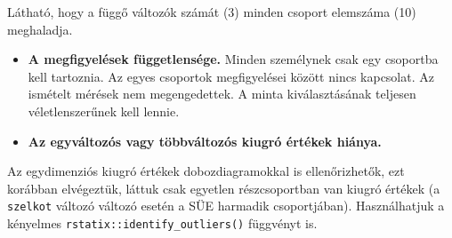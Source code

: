 \documentclass[
  letterpaper,
]{krantz}
\makeatletter
\newenvironment{Shaded}{\begin{snugshade}}{\end{snugshade}}
\newcommand{\AttributeTok}[1]{\textcolor[rgb]{0.40,0.45,0.13}{#1}}
\newcommand{\CommentTok}[1]{\textcolor[rgb]{0.37,0.37,0.37}{#1}}
\newcommand{\ConstantTok}[1]{\textcolor[rgb]{0.56,0.35,0.01}{#1}}
\newcommand{\FunctionTok}[1]{\textcolor[rgb]{0.28,0.35,0.67}{#1}}
\newcommand{\NormalTok}[1]{\textcolor[rgb]{0.00,0.23,0.31}{#1}}
\newcommand{\SpecialCharTok}[1]{\textcolor[rgb]{0.37,0.37,0.37}{#1}}
\newenvironment{kframe}{%
\medskip{}
\setlength{\fboxsep}{.8em}
 \def\at@end@of@kframe{}%
 \ifinner\ifhmode%
  \def\at@end@of@kframe{\end{minipage}}%
  \begin{minipage}{\columnwidth}%
 \fi\fi%
 \def\FrameCommand##1{\hskip\@totalleftmargin \hskip-\fboxsep
 \colorbox{shadecolor}{##1}\hskip-\fboxsep
     \hskip-\linewidth \hskip-\@totalleftmargin \hskip\columnwidth}%
 \MakeFramed {\advance\hsize-\width
   \@totalleftmargin\z@ \linewidth\hsize
   \@setminipage}}%
 {\par\unskip\endMakeFramed%
 \at@end@of@kframe}
\renewenvironment{Shaded}{\begin{kframe}}{\end{kframe}}
\makeatother
\begin{document}
\begin{Shaded}
\end{Shaded}

Látható, hogy a függő változók számát (3) minden csoport elemszáma (10)
meghaladja.

\begin{itemize}
\item
  \textbf{A megfigyelések függetlensége.} Minden személynek csak egy
  csoportba kell tartoznia. Az egyes csoportok megfigyelései között
  nincs kapcsolat. Az ismételt mérések nem megengedettek. A minta
  kiválasztásának teljesen véletlenszerűnek kell lennie.
\item
  \textbf{Az egyváltozós vagy többváltozós kiugró értékek hiánya.}
\end{itemize}

Az egydimenziós kiugró értékek dobozdiagramokkal is ellenőrizhetők, ezt
korábban elvégeztük, láttuk csak egyetlen részcsoportban van kiugró
értékek (a \texttt{szelkot} változó változó esetén a SÜE harmadik
csoportjában). Használhatjuk a kényelmes
\texttt{rstatix::identify\_outliers()} függvényt is.
\end{document}
